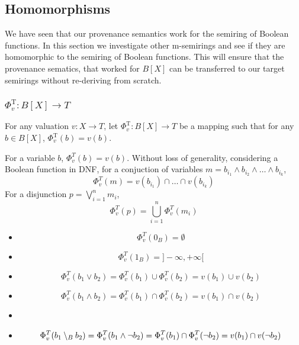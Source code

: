 \subsection{Homomorphisms}
We have seen that our provenance semantics work for 
the semiring of Boolean functions. In this section we investigate other m-semirings and see if they are homomorphic 
to the semiring of Boolean functions. This will ensure that the provenance sematics, that worked for $B[X]$ can be transferred to 
our target semirings without re-deriving from scratch.


\subsubsection{$\Phi^{\mathrm{T}}_v : B[X] \to T$}
For any valuation $v:X \to T$, let $\Phi^{\mathrm{T}}_v : B[X] \to T$ be a mapping such that for any $b\in B[X]$, 
$\Phi^{\mathrm{T}}_v(b)=v(b)$.

For a variable $b$, $\Phi_v^T(b) = v(b)$.
Without loss of generality, considering a Boolean function in DNF, for a conjuction of variables $m = b_{i_1} \wedge b_{i_2} \wedge \dots \wedge b_{i_k}$,
$$\Phi_v^T(m) = v(b_{i_1}) \cap \dots \cap v(b_{i_k})$$
For a disjunction $p = \bigvee_{i=1}^n m_i$,
$$\Phi_v^T(p) = \bigcup_{i=1}^n \Phi_v^T(m_i)$$
\begin{itemize}
    \item $$\Phi_v^T(0_{B}) = \emptyset$$
    \item $$\Phi_v^T(1_{B}) = ]-\infty, +\infty[$$
    \item $$\Phi_v^T(b_1 \vee b_2) = \Phi_v^T(b_1) \cup \Phi_v^T(b_2) = v(b_1)\cup v(b_2)$$
    \item $$\Phi_v^T(b_1 \wedge b_2) = \Phi_v^T(b_1) \cap \Phi_v^T(b_2) = v(b_1)\cap v(b_2)$$
    \item \item $$\Phi_v^T(b_1 \setminus_B b_2) = \Phi_v^T(b_1 \wedge \neg b_2) = \Phi_v^T(b_1)\cap \Phi_v^T(\neg b_2)\\
    = v(b_1)\cap v(\neg b_2)$$
\end{itemize}

